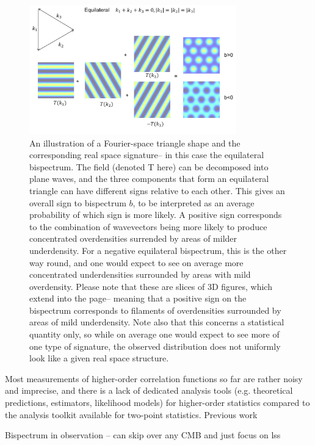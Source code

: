 \begin{figure}[ht!]
	\centering
	\includegraphics[width=0.8\textwidth]{fig/Equilateral.png}
	\caption{An illustration of a Fourier-space triangle shape and the corresponding real space signature-- in this case the equilateral bispectrum. The field (denoted T here) can be decomposed into plane waves, and the three components that form an equilateral triangle can have different signs relative to each other. This gives an overall sign to bispectrum $b$, to be interpreted as an average probability of which sign is more likely. A positive sign corresponds to the combination of wavevectors being more likely to produce concentrated overdensities surrended by areas of milder underdensity. For a negative equilateral bispectrum, this is the other way round, and one would expect to see on average more concentrated underdensities surrounded by areas with mild overdensity. Please note that these are slices of 3D figures, which extend into the page-- meaning that a positive sign on the bispectrum corresponds to filaments of overdensities surrounded by areas of mild underdensity. Note also that this concerns a statistical quantity only, so while on average one would expect to see more of one type of signature, the observed distribution does not uniformly look like a given real space structure.~\cite{Lewis:2011}}
	\label{fig:realspacesignature}
\end{figure}

Most measurements of higher-order correlation functions so far are rather noisy and imprecise, and there is a lack of dedicated analysis tools (e.g. theoretical predictions, estimators, likelihood models) for higher-order statistics compared to the analysis toolkit available for two-point statistics. Previous work 

Bispectrum in observation -- can skip over any CMB and just focus on lss

